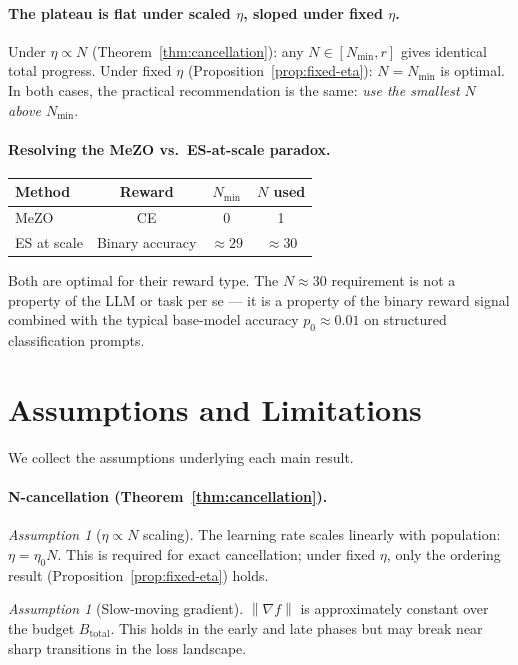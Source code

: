 \documentclass[11pt]{article}
\theoremstyle{definition}
\theoremstyle{remark}
\newtheorem{assumption}[theorem]{Assumption}
\newcommand{\norm}[1]{\left\|#1\right\|}
\newcommand{\Nmin}{N_{\mathrm{min}}}
\begin{document}
\paragraph{The plateau is flat under scaled $\eta$, sloped under fixed $\eta$.}
Under $\eta \propto N$ (Theorem~\ref{thm:cancellation}): any $N \in [\Nmin, r]$ gives identical total progress. Under fixed $\eta$ (Proposition~\ref{prop:fixed-eta}): $N = \Nmin$ is optimal. In both cases, the practical recommendation is the same: \emph{use the smallest $N$ above $\Nmin$}.

\paragraph{Resolving the MeZO vs.\ ES-at-scale paradox.}
\begin{center}
\begin{tabular}{lccc}
\toprule
Method & Reward & $\Nmin$ & $N$ used\\
\midrule
MeZO \citep{malladi2023mezo} & CE & 0 & 1\\
ES at scale \citep{qiu2024esscale} & Binary accuracy & $\approx 29$ & $\approx 30$\\
\bottomrule
\end{tabular}
\end{center}

Both are optimal for their reward type. The $N \approx 30$ requirement is not a property of the LLM or task per se --- it is a property of the binary reward signal combined with the typical base-model accuracy $p_0 \approx 0.01$ on structured classification prompts.

\section{Assumptions and Limitations}
\label{sec:assumptions}

We collect the assumptions underlying each main result.

\paragraph{N-cancellation (Theorem~\ref{thm:cancellation}).}
\begin{assumption}[$\eta \propto N$ scaling]
The learning rate scales linearly with population: $\eta = \eta_0 N$. This is required for exact cancellation; under fixed $\eta$, only the ordering result (Proposition~\ref{prop:fixed-eta}) holds.
\end{assumption}
\begin{assumption}[Slow-moving gradient]
$\norm{\nabla f}$ is approximately constant over the budget $B_{\mathrm{total}}$. This holds in the early and late phases but may break near sharp transitions in the loss landscape.
\end{assumption}
\end{document}
